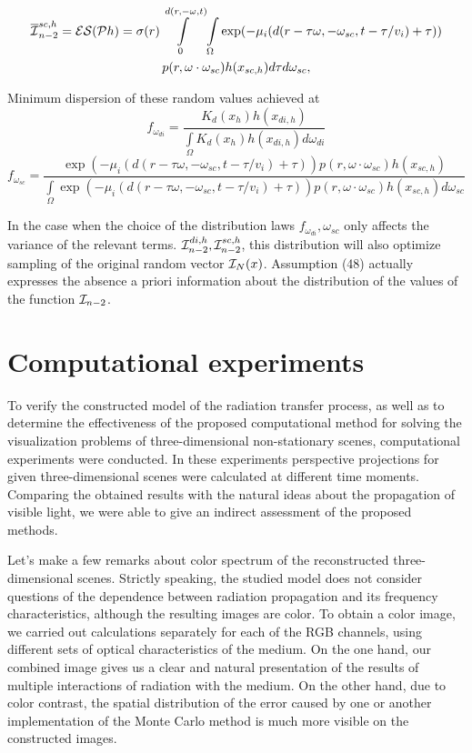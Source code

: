 \documentclass[12pt,reqno]{report}
\begin{document}
{\begin{multline}
{\overline{\cal I}_{n-2}^{sc, h}} = {\cal ES} (\mathcal{P} h) = 
\sigma(r) \int \limits^{d(r,-\omega,t)}_0 \int\limits_{\Omega} \exp(- \mu_i (d(r-\tau\omega, -\omega_{sc}, t-\tau/v_i) + \tau)) \\ 
p(r,\omega \cdot\omega_{sc}) h(x_{sc, h})d\tau d\omega_{sc},
\end{multline}

Minimum dispersion of these random values achieved at
\begin{equation}
f_{\omega_{di}} =\frac{K_d(x_h) h(x_{di, h})} {\int\limits_{\Omega} K_d(x_h) h(x_{di, h}) d \omega_{di}}
\end{equation}
\begin{equation}
f_{\omega_{sc}} = \frac{\exp(- \mu_i (d(r-\tau\omega, -\omega_{sc}, t-\tau/v_i) + \tau)) p(r,\omega \cdot\omega_{sc}) h(x_{sc, h})}
{\int\limits_{\Omega}\exp(- \mu_i (d(r-\tau\omega, -\omega_{sc}, t-\tau/v_i) + \tau)) p(r,\omega \cdot\omega_{sc}) h(x_{sc, h}) d \omega_{sc}}
\end{equation}

In the case when the choice of the distribution laws 
$f_{\omega_{di}}, \omega_{sc}$ 
only affects the variance of the relevant terms.
${\cal I}_{n-2}^{di, h}, {\cal I}_{n-2}^{sc, h}$,
this distribution will also optimize sampling of the original random vector ${\cal I}_N(x)$.
Assumption (48) actually expresses the absence
a priori information about the distribution of the values of the function ${\cal I}_{n-2}$.

\section{Computational experiments}

To verify the constructed model of the radiation transfer process, 
as well as to determine the effectiveness of the proposed computational method 
for solving the visualization problems of three-dimensional non-stationary scenes, 
computational experiments were conducted.
In these experiments perspective projections for given three-dimensional scenes were calculated at different time moments. 
Comparing the obtained results with the natural ideas about the propagation of visible light, 
we were able to give an indirect assessment of the proposed methods.

Let's make a few remarks about color spectrum of the reconstructed three-dimensional scenes. 
Strictly speaking, the studied model does not consider questions of the dependence between radiation propagation and its frequency characteristics, 
although the resulting images are color. To obtain a color image, we carried out calculations separately for each of the RGB channels, 
using different sets of optical characteristics of the medium. 
On the one hand, our combined image gives us a clear and natural presentation of the results of multiple interactions of radiation with the medium. 
On the other hand, due to color contrast, the spatial distribution of the error caused by one or another 
implementation of the Monte Carlo method is much more visible on the constructed images.

}
\end{document}
